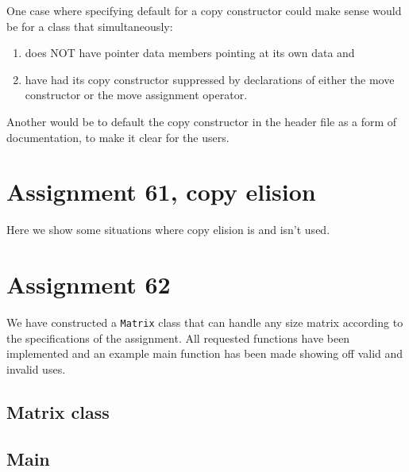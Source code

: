 \documentclass[11pt]{article}
\begin{document}
One case where specifying default for a copy constructor could make sense would be for a class that simultaneously:
\begin{enumerate}
\item does NOT have pointer data members pointing at its own data and
\item have had its copy constructor suppressed by declarations of either the move constructor or the move assignment operator.
\end{enumerate}
Another would be to default the copy constructor in the header file as a form of documentation, to make it clear for the users.

\section*{Assignment 61, copy elision}
Here we show some situations where copy elision is and isn't used.



\section*{Assignment 62}
We have constructed a \texttt{Matrix} class that can handle any size matrix according to the specifications of the assignment.
All requested functions have been implemented and an example main function has been made showing off valid and invalid uses.

\subsection*{Matrix class}
















\subsection*{Main}




\end{document}
